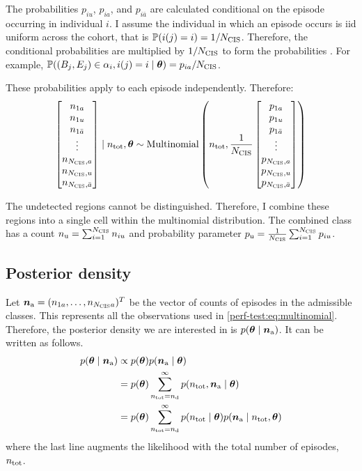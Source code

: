 \documentclass[thesis.tex]{subfiles}
\begin{document}
The probabilities $p_{iu}$, $p_{ia}$, and $p_{i\bar{a}}$ are calculated conditional on the episode occurring in individual $i$.
I assume the individual in which an episode occurs is iid uniform across the cohort, that is $\operatorname{\mathbb{P}}(i(j) = i) = 1/N_\text{CIS}$.
Therefore, the conditional probabilities are multiplied by $1/N_\text{CIS}$ to form the probabilities .
For example, $\operatorname{\mathbb{P}}((B_j, E_j) \in \alpha_i, i(j) = i \mid \bm\theta) = p_{ia} / N_\text{CIS}$.

These probabilities apply to each episode independently.
Therefore:
\begin{align}
  \begin{bmatrix}
    n_{1a} \\ n_{1u} \\ n_{1\bar{a}} \\ \vdots \\ n_{N_\text{CIS},a} \\ n_{N_\text{CIS},u} \\ n_{N_\text{CIS},\bar{a}}
  \end{bmatrix}
  \mid n_\text{tot}, \bm{\theta}
  \sim
  \operatorname{Multinomial}\left(
    n_\text{tot},
    \frac{1}{N_\text{CIS}}
    \begin{bmatrix}
      p_{1a} \\ p_{1u} \\ p_{1\bar{a}} \\ \vdots \\ p_{N_\text{CIS},a} \\ p_{N_\text{CIS},u} \\ p_{N_\text{CIS},\bar{a}}
    \end{bmatrix}
  \right)
  \label{perf-test:eq:multinomial}
\end{align}

The undetected regions cannot be distinguished.
Therefore, I combine these regions into a single cell within the multinomial distribution.
The combined class has a count $n_\text{u} = \sum_{i=1}^{N_\text{CIS}} n_{iu}$ and probability parameter $p_\text{u} = \frac{1}{N_\text{CIS}} \sum_{i=1}^{N_\text{CIS}} p_{iu}$.

\subsection{Posterior density} \label{perf-test:sec:posterior-density}

Let $\bm{n}_\text{a} = (n_{1a}, \dots, n_{N_\text{CIS} a})^T$ be the vector of counts of episodes in the admissible classes.
This represents all the observations used in \cref{perf-test:eq:multinomial}.
Therefore, the posterior density we are interested in is $p(\bm{\theta} \mid \bm{n}_\text{a})$.
It can be written as follows.
\begin{align}
p(\bm{\theta} \mid \bm{n}_\text{a})
&\propto p(\bm{\theta}) p(\bm{n}_\text{a} \mid \bm{\theta}) \\
&= p(\bm\theta) \sum_{n_\text{tot}= n_\text{d}}^{\infty} p(n_\text{tot}, \bm{n}_\text{a} \mid \bm{\theta}) \\
&= p(\bm{\theta}) \sum_{n_\text{tot}=n_\text{d}}^\infty p(n_\text{tot} \mid \bm{\theta}) p(\bm{n}_\text{a} \mid n_\text{tot}, \bm{\theta})
\label{perf-test:eq:posterior1}
\end{align}
where the last line augments the likelihood with the total number of episodes, $n_\text{tot}$.
\end{document}
